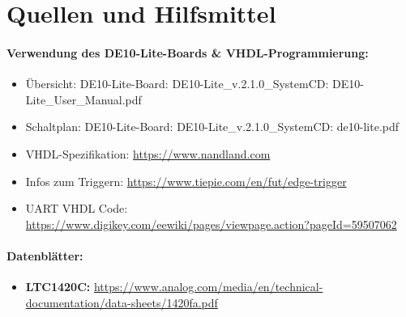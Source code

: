 \section{Quellen und Hilfsmittel}
\paragraph{Verwendung des DE10-Lite-Boards \& VHDL-Programmierung:}
\begin{itemize}
\item
Übersicht: DE10-Lite-Board: DE10-Lite\_v.2.1.0\_SystemCD: DE10-Lite\_User\_Manual.pdf
\item
\label{Schaltplan_FPGA}
Schaltplan: DE10-Lite-Board: DE10-Lite\_v.2.1.0\_SystemCD: de10-lite.pdf
\item
VHDL-Spezifikation: \url{https://www.nandland.com}
\item
Infos zum Triggern: \url{https://www.tiepie.com/en/fut/edge-trigger}
\item
UART VHDL Code: \url{https://www.digikey.com/eewiki/pages/viewpage.action?pageId=59507062}
\end{itemize}
\paragraph{Datenblätter:}
\begin{itemize}
\item \label{LTC1420C_dat}
\textbf{LTC1420C:} \url{https://www.analog.com/media/en/technical-documentation/data-sheets/1420fa.pdf}
\end{itemize}
	